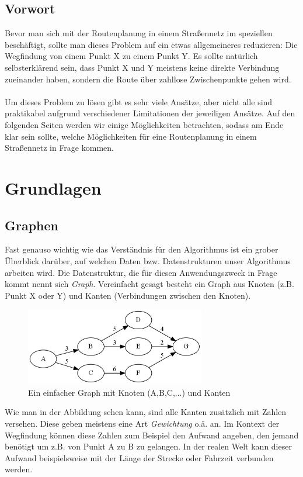 \documentclass[11pt]{scrreprt}
\begin{document}
	\section{Vorwort}
	Bevor man sich mit der Routenplanung in einem Straßennetz im speziellen beschäftigt, sollte man dieses Problem auf ein etwas allgemeineres reduzieren: Die Wegfindung von einem Punkt X zu einem Punkt Y.
	Es sollte natürlich selbsterklärend sein, dass Punkt X und Y meistens keine direkte Verbindung zueinander haben, sondern die Route über zahllose Zwischenpunkte gehen wird.
	\\\\
	Um dieses Problem zu lösen gibt es sehr viele Ansätze, aber nicht alle sind praktikabel aufgrund verschiedener Limitationen der jeweiligen Ansätze.
	Auf den folgenden Seiten werden wir einige Möglichkeiten betrachten, sodass am Ende klar sein sollte, welche Möglichkeiten für eine Routenplanung in einem Straßennetz in Frage kommen.

\chapter{Grundlagen}
	\section{Graphen}
	Fast genauso wichtig wie das Verständnis für den Algorithmus ist ein grober Überblick darüber, auf welchen Daten bzw. Datenstrukturen unser Algorithmus arbeiten wird.
	Die Datenstruktur, die für diesen Anwendungszweck in Frage kommt nennt sich \textit{Graph}.
	Vereinfacht gesagt besteht ein Graph aus Knoten (z.B. Punkt X oder Y) und Kanten (Verbindungen zwischen den Knoten).

	\begin{figure}[ht]
		\centering
		\includegraphics[width=0.7\textwidth]{Graphs/hello}
		\caption{Ein einfacher Graph mit Knoten (A,B,C,...) und Kanten}
	\end{figure}

	Wie man in der Abbildung sehen kann, sind alle Kanten zusätzlich mit Zahlen versehen. Diese geben meistens eine Art \textit{Gewichtung} o.ä. an. Im Kontext der Wegfindung können diese Zahlen zum Beispiel den Aufwand angeben, den jemand benötigt um z.B. von Punkt A zu B zu gelangen. In der realen Welt kann dieser Aufwand beispielsweise mit der Länge der Strecke oder Fahrzeit verbunden werden.
	\newpage
\end{document}
